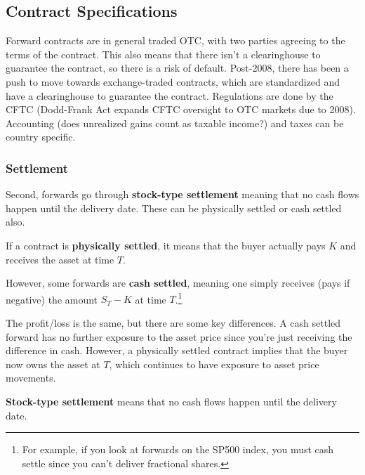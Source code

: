 \documentclass{article}
\begin{document}
  \subsection{Contract Specifications}
  
    Forward contracts are in general traded OTC, with two parties agreeing to the terms of the contract. This also means that there isn't a clearinghouse to guarantee the contract, so there is a risk of default. Post-2008, there has been a push to move towards exchange-traded contracts, which are standardized and have a clearinghouse to guarantee the contract. Regulations are done by the CFTC (Dodd-Frank Act expands CFTC oversight to OTC markets due to 2008). Accounting (does unrealized gains count as taxable income?) and taxes can be country specific. 

    \subsubsection{Settlement}

      Second, forwards go through \textbf{stock-type settlement} meaning that no cash flows happen until the delivery date. These can be physically settled or cash settled also. 

      \begin{definition}
        \label{def:physical-settlement}
        If a contract is \textbf{physically settled}, it means that the buyer actually pays $K$ and receives the asset at time $T$. 
      \end{definition}

      \begin{definition}
        \label{def:cash-settlement}
        However, some forwards are \textbf{cash settled}, meaning one simply receives (pays if negative) the amount $S_T - K$ at time $T$.\footnote{For example, if you look at forwards on the SP500 index, you must cash settle since you can't deliver fractional shares. }
      \end{definition}

      The profit/loss is the same, but there are some key differences. A cash settled forward has no further exposure to the asset price since you're just receiving the difference in cash. However, a physically settled contract implies that the buyer now owns the asset at $T$, which continues to have exposure to asset price movements. 

      \begin{definition}
        \label{def:stock-type-settlement}
        \textbf{Stock-type settlement} means that no cash flows happen until the delivery date.
      \end{definition}
\end{document}
